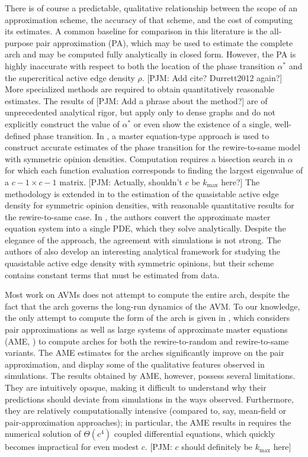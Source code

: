 \documentclass[review, onefignum, onetabnum]{siamart171218}
\newcommand{\pjm}[1]{{\color{blue}[PJM: #1]}}
\begin{document}
	There is of course a predictable, qualitative relationship between the scope of an approximation scheme, the accuracy of that scheme, and the cost of computing its estimates. 
	A common baseline for comparison in this literature is the all-purpose pair approximation (PA), which may be used to estimate the complete arch and may be computed fully analytically in closed form. 
	However, the PA is highly inaccurate with respect to both the location of the phase transition $\alpha^*$ and the supercritical active edge density $\rho$. \pjm{Add cite? Durrett2012 again?}
	More specialized methods are required to obtain quantitatively reasonable estimates. 
	The results of \cite{Basu2015a} \pjm{Add a phrase about the method?} are of unprecedented analytical rigor, but apply only to dense graphs and do not explicitly construct the value of $\alpha^*$ or even show the existence of a single, well-defined phase transition. 
	In \cite{Bohme2011}, a master equation-type approach is used to construct accurate estimates of the phase transition for the rewire-to-same model with symmetric opinion densities. 
	Computation requires a bisection search in $\alpha$ for which each function evaluation corresponds to finding the largest eigenvalue of a $c-1 \times c-1$ matrix. \pjm{Actually, shouldn't $c$ be $k_\mathrm{max}$ here?}
	The methodology is extended in \cite{Demirel2012} to the estimation of the quasistable active edge density for symmetric opinion densities, with reasonable quantitative results for the rewire-to-same case. 
	In \cite{Silk2014}, the authors convert the approximate master equation system into a single PDE, which they solve analytically. 
	Despite the elegance of the approach, the agreement with simulations is not strong. 
	The authors of \cite{Ji2013} also develop an interesting analytical framework for studying the quasistable active edge density with symmetric opinions, but their scheme contains constant terms that must be estimated from data. 

	Most work on AVMs does not attempt to compute the entire arch, despite the fact that the arch governs the long-run dynamics of the AVM. 
	To our knowledge, the only attempt to compute the form of the arch is given in \cite{Durrett2012}, which considers pair approximations as well as large systems of approximate master equations (AME, \cite{Gleeson2013}) to compute arches for both the rewire-to-random and rewire-to-same variants.
	The AME estimates for the arches significantly improve on the pair approximation, and display some of the qualitative features observed in simulations. 
	The results obtained by AME, however, possess several limitations. 
	They are intuitively opaque, making it difficult to understand why their predictions should deviate from simulations in the ways observed.  
	Furthermore, they are relatively computationally intensive (compared to, say, mean-field or pair-approximation approaches); in particular, the AME results in \cite{Durrett2012} requires the numerical solution of $\Theta(c^4)$ coupled differential equations, which quickly becomes impractical for even modest $c$. \pjm{$c$ should definitely be $k_\mathrm{max}$ here}
\end{document}
